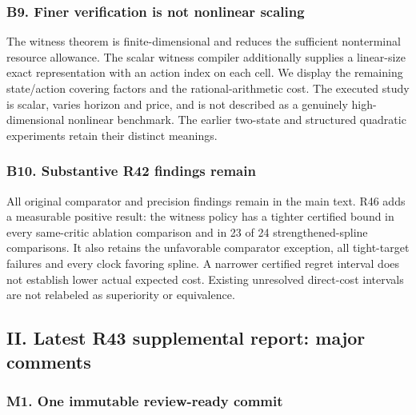 \documentclass[ecta,nameyear,draft]{econsocart}
\begin{document}
\hypertarget{b9-finer-verification-is-not-nonlinear-scaling}{%
\subsubsection{B9. Finer verification is not nonlinear
scaling}\label{b9-finer-verification-is-not-nonlinear-scaling}}

The witness theorem is finite-dimensional and reduces the sufficient
nonterminal resource allowance. The scalar witness compiler additionally
supplies a linear-size exact representation with an action index on each
cell. We display the remaining state/action covering factors and the
rational-arithmetic cost. The executed study is scalar, varies horizon
and price, and is not described as a genuinely high-dimensional
nonlinear benchmark. The earlier two-state and structured quadratic
experiments retain their distinct meanings.

\hypertarget{b10-substantive-r42-findings-remain}{%
\subsubsection{B10. Substantive R42 findings
remain}\label{b10-substantive-r42-findings-remain}}

All original comparator and precision findings remain in the main text.
R46 adds a measurable positive result: the witness policy has a tighter
certified bound in every same-critic ablation comparison and in 23 of 24
strengthened-spline comparisons. It also retains the unfavorable
comparator exception, all tight-target failures and every clock favoring
spline. A narrower certified regret interval does not establish lower
actual expected cost. Existing unresolved direct-cost intervals are not
relabeled as superiority or equivalence.

\hypertarget{ii-latest-r43-supplemental-report-major-comments}{%
\subsection{II. Latest R43 supplemental report: major
comments}\label{ii-latest-r43-supplemental-report-major-comments}}

\hypertarget{m1-one-immutable-review-ready-commit}{%
\subsubsection{M1. One immutable review-ready
commit}\label{m1-one-immutable-review-ready-commit}}
\end{document}
